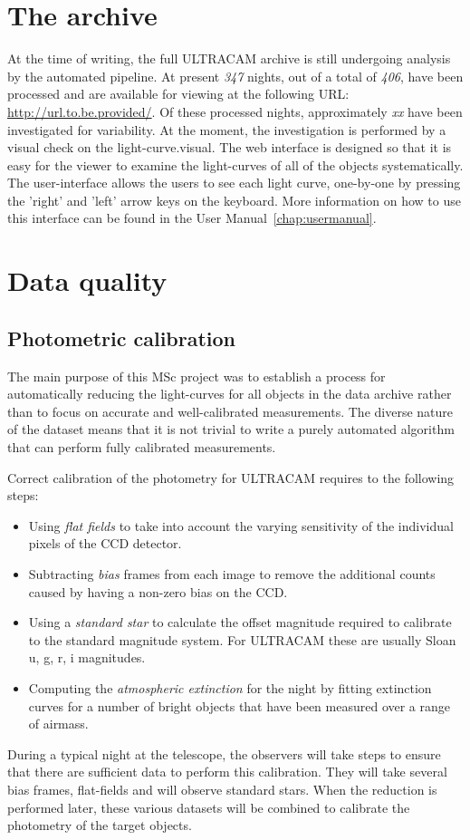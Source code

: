 \section{The archive} 

At the time of writing, the full ULTRACAM archive is still undergoing analysis by the automated pipeline. At present \emph{347} nights, out of a total of \emph{406}, have been processed and are available for viewing at the following URL: \url{http://url.to.be.provided/}. Of these processed nights, approximately \emph{xx} have been investigated for variability. At the moment, the investigation is performed by a visual check on the light-curve.visual. The web interface is designed so that it is easy for the viewer to examine the light-curves of all of the objects systematically. The user-interface allows the users to see each light curve, one-by-one by pressing the 'right' and 'left'  arrow keys on the keyboard. More information on how to use this interface can be found in the User Manual~\ref{chap:usermanual}. 

\section{Data quality}

\subsection{Photometric calibration}
The main purpose of this MSc project was to establish a process for automatically reducing the light-curves for all objects in the data archive rather than to focus on accurate and well-calibrated measurements. The diverse nature of the dataset means that it is not trivial to write a purely automated algorithm that can perform fully calibrated measurements. 

Correct calibration of the photometry for ULTRACAM requires to the following steps:
\begin{itemize}
  \item Using \emph{flat fields} to take into account the varying sensitivity of the individual pixels of the CCD detector. 
  \item Subtracting \emph{bias} frames from each image to remove the additional counts caused by having a non-zero bias on the CCD. 
  \item Using a \emph{standard star} to calculate the offset magnitude required to calibrate to the standard magnitude system. For ULTRACAM these are usually Sloan u, g, r, i magnitudes.
  \item Computing the \emph{atmospheric extinction} for the night by fitting extinction curves for a number of bright objects that have been measured over a range of airmass. 
\end{itemize}
During a typical night at the telescope, the observers will take steps to ensure that there are sufficient data to perform this calibration. They will take several bias frames, flat-fields and will observe standard stars. When the reduction is performed later, these various datasets will be combined to calibrate the photometry of the target objects. 

